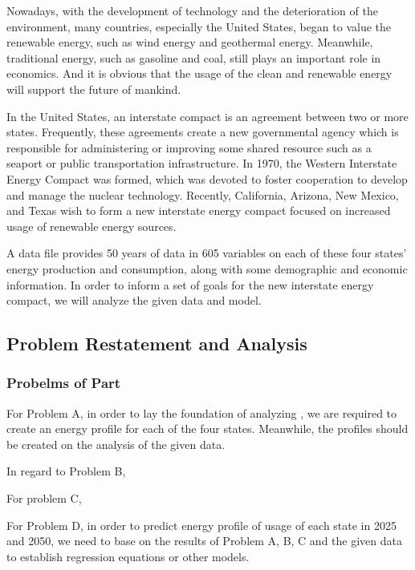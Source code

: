 \documentclass[a4paper,11pt]{article}
\begin{document}
\par Nowadays, with the development of technology and the deterioration of the environment, many countries, especially the United States, began to value the renewable energy, such as wind energy and geothermal energy. Meanwhile, traditional energy, such as gasoline and coal, still plays an important role in economics. And it is obvious that the usage of the clean and renewable energy will support the future of mankind.
\par In the United States, an interstate compact is an agreement between two or more states. Frequently, these agreements create a new governmental agency which is responsible for administering or improving some shared resource such as a seaport or public transportation infrastructure.\cite{1} In 1970, the Western Interstate Energy Compact was formed, which was devoted to foster cooperation to develop and manage the nuclear technology. Recently, California, Arizona, New Mexico, and Texas wish to form a new interstate energy compact focused on increased usage of renewable energy sources. 
\par A data file provides 50 years of data in 605 variables on each of these four states' energy production and consumption, along with some demographic and economic information. In order to inform a set of goals for the new interstate energy compact, we will analyze the given data and model.





\subsection{Problem Restatement and Analysis}
\subsubsection{Probelms of Part \uppercase\expandafter{}}
\par For Problem A, in order to lay the foundation of analyzing , we are required to create an energy profile for each of the four states. Meanwhile, the profiles should be created on the analysis of the given data.

\par In regard to Problem B, 

\par For problem C, 

\par For Problem D, in order to predict energy profile of usage of each state in 2025 and 2050, we need to base on the results of Problem A, B, C and the given data to establish regression equations or other models.
\end{document}
